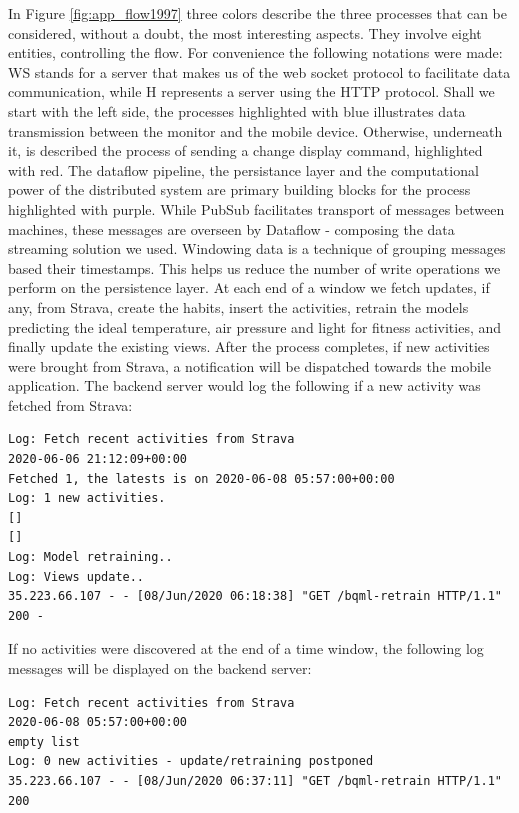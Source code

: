 In Figure \ref{fig:app_flow1997} three colors describe the three processes that can be considered, without a doubt, the most interesting aspects. They involve eight entities, controlling the flow. For convenience the following notations were made: WS stands for a server that makes us of the web socket protocol to facilitate data communication, while H represents a server using the HTTP protocol. Shall we start with the left side, the processes highlighted with blue illustrates data transmission between the monitor and the mobile device. Otherwise, underneath it, is described the process of sending a change display command, highlighted with red. The dataflow pipeline, the persistance layer and the computational power of the distributed system are primary building blocks for the process highlighted with purple. While PubSub facilitates transport of messages between machines, these messages are overseen by Dataflow - composing the data streaming solution we used. Windowing data is a technique of grouping messages based their timestamps. This helps us reduce the number of write operations we perform on the persistence layer. At each end of a window we fetch updates, if any, from Strava, create the habits, insert the activities, retrain the models predicting the ideal temperature, air pressure and light for fitness activities, and finally update the existing views. After the process completes, if new activities were brought from Strava, a notification will be dispatched towards the mobile application. The backend server would log the following if a new activity was fetched from Strava:

\begin{lstlisting}
Log: Fetch recent activities from Strava
2020-06-06 21:12:09+00:00
Fetched 1, the latests is on 2020-06-08 05:57:00+00:00
Log: 1 new activities.
[]
[]
Log: Model retraining..
Log: Views update..
35.223.66.107 - - [08/Jun/2020 06:18:38] "GET /bqml-retrain HTTP/1.1" 200 -
\end{lstlisting}

If no activities were discovered at the end of a time window, the following log messages will be displayed on the backend server:

\begin{lstlisting}
Log: Fetch recent activities from Strava
2020-06-08 05:57:00+00:00
empty list
Log: 0 new activities - update/retraining postponed
35.223.66.107 - - [08/Jun/2020 06:37:11] "GET /bqml-retrain HTTP/1.1" 200
\end{lstlisting}

